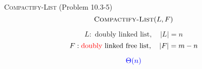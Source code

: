 \begin{frame}{}
  \begin{exampleblock}{\textsc{Compactify-List} (Problem 10.3-5)}
    \[
      \textsc{Compactify-List}(L, F)
    \]

    \[
      L: \text{ doubly linked list}, \quad |L| = n
    \]
    \[
      F: \textcolor{red}{\text{doubly}} \text{ linked free list}, \quad |F| = m - n
    \]

    \[
      \textcolor{blue}{\Theta(n)}
    \]
  \end{exampleblock}
\end{frame}

\begin{frame}{}


  \pause
  \begin{center}
  \end{center}

  \pause
  \begin{center}
  \end{center}
\end{frame}
